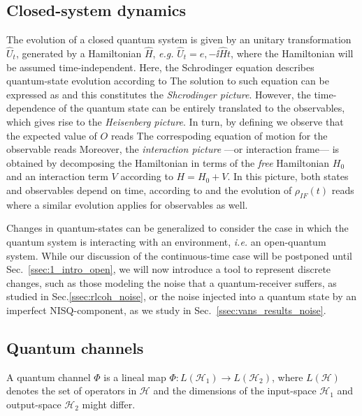 \subsection{Closed-system dynamics}\label{ssec:1_intro_unitary_evo}
The evolution of a closed quantum system is given by an unitary transformation $\hat{U}_t$, generated by a Hamiltonian $\hat{H}$, \textit{e.g.} $\hat{U}_t = e, {-\ii \hat{H}t}$, where the Hamiltonian will be assumed time-independent. Here, the Schrodinger equation describes quantum-state evolution according to
 The solution to such equation can be expressed as  and this constitutes the \textit{Shcrodinger picture}.
However, the time-dependence of the quantum state can be entirely translated to the observables, which gives rise to the \textit{Heisenberg picture}. In turn, by defining we observe that the expected value of $O$ reads  The correspoding equation of motion for the observable reads
Moreover, the \textit{interaction picture} ---or interaction frame--- is obtained by decomposing the Hamiltonian in terms of the \textit{free} Hamiltonian $H_0$ and an interaction term $V$ according to $H=H_0 + V$. In this picture, both states and observables depend on time, according to  and the evolution of $\rho_{IF}(t)$ reads 
where a similar evolution applies for observables as well.

Changes in quantum-states can be generalized to consider the case in which the quantum system is interacting with an environment, \textit{i.e.} an open-quantum system. While our discussion of the continuous-time case will be postponed until Sec.~\ref{ssec:1_intro_open}, we will now introduce a tool to represent discrete changes, such as those modeling the noise that a quantum-receiver suffers, as studied in Sec.\ref{ssec:rlcoh_noise}, or the noise injected into a quantum state by an imperfect NISQ-component, as we study in Sec.~\ref{ssec:vans_results_noise}.

\subsection{Quantum channels}\label{ssec:1_intro_channels}
A quantum channel $\Phi$ is a lineal map $\Phi:L(\mathcal{H}_1) \rightarrow L(\mathcal{H}_2)$, where $L(\mathcal{H})$ denotes the set of operators in $\mathcal{H}$ and the dimensions of the input-space $\mathcal{H}_1$ and output-space $\mathcal{H}_2$ might differ.

